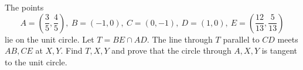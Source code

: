 The points
\[
A=\left(\dfrac{3}{5},\dfrac{4}{5}\right),\ B=(-1,0),\ C=(0,-1),\ D=(1,0),\
E=\left(\dfrac{12}{13},\dfrac{5}{13}\right)
\]
lie on the unit circle. Let $T=BE\cap AD$. The line through $T$ parallel to $CD$ meets $AB,CE$ at $X,Y$. Find $T,X,Y$ and prove that the circle through $A,X,Y$ is tangent to the unit circle.
